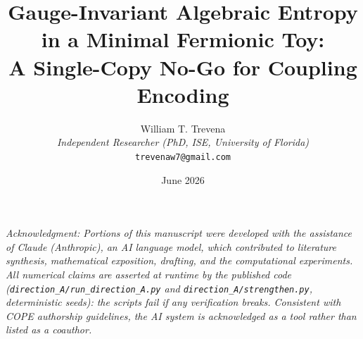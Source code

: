 \documentclass[11pt]{article}
\title{Gauge-Invariant Algebraic Entropy in a Minimal Fermionic Toy:\\ A Single-Copy No-Go for Coupling Encoding}
\author{William T. Trevena\\[3pt]
{\small\itshape Independent Researcher (PhD, ISE, University of Florida)}\\
{\small\texttt{trevenaw7@gmail.com}}}
\date{June 2026}
\begin{document}
\maketitle

{\small\itshape\sloppy Acknowledgment: Portions of this manuscript were developed with the assistance of Claude (Anthropic), an AI language model, which contributed to literature synthesis, mathematical exposition, drafting, and the computational experiments. All numerical claims are asserted at runtime by the published code (\texttt{direction\_A/run\_direction\_A.py} and \texttt{direction\_A/strengthen.py}, deterministic seeds): the scripts fail if any verification breaks. Consistent with COPE authorship guidelines, the AI system is acknowledged as a tool rather than listed as a coauthor.\par}
\end{document}
